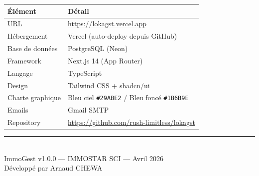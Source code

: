 \documentclass[12pt,a4paper]{article}
\begin{document}
\begin{tabularx}{\textwidth}{lX}
\toprule
\textbf{\'El\'ement} & \textbf{D\'etail} \\
\midrule
URL & \url{https://lokagst.vercel.app} \\
H\'ebergement & Vercel (auto-deploy depuis GitHub) \\
Base de donn\'ees & PostgreSQL (Neon) \\
Framework & Next.js 14 (App Router) \\
Langage & TypeScript \\
Design & Tailwind CSS + shadcn/ui \\
Charte graphique & Bleu ciel \texttt{\#29ABE2} / Bleu fonc\'e \texttt{\#1B6B9E} \\
Emails & Gmail SMTP \\
Repository & \url{https://github.com/rush-limitless/lokagst} \\
\bottomrule
\end{tabularx}

\vfill
\begin{center}
\textcolor{grisTexte}{\rule{0.5\textwidth}{0.4pt}}\\[0.5em]
{\small\textcolor{grisTexte}{ImmoGest v1.0.0 --- IMMOSTAR SCI --- Avril 2026}}\\
{\small\textcolor{grisTexte}{D\'evelopp\'e par Arnaud CHEWA}}
\end{center}
\end{document}
